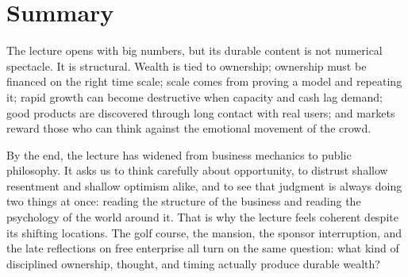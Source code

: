 \section{Summary}

The lecture opens with big numbers, but its durable content is not numerical spectacle. It is structural. Wealth is tied to ownership; ownership must be financed on the right time scale; scale comes from proving a model and repeating it; rapid growth can become destructive when capacity and cash lag demand; good products are discovered through long contact with real users; and markets reward those who can think against the emotional movement of the crowd.

By the end, the lecture has widened from business mechanics to public philosophy. It asks us to think carefully about opportunity, to distrust shallow resentment and shallow optimism alike, and to see that judgment is always doing two things at once: reading the structure of the business and reading the psychology of the world around it. That is why the lecture feels coherent despite its shifting locations. The golf course, the mansion, the sponsor interruption, and the late reflections on free enterprise all turn on the same question: what kind of disciplined ownership, thought, and timing actually produce durable wealth?